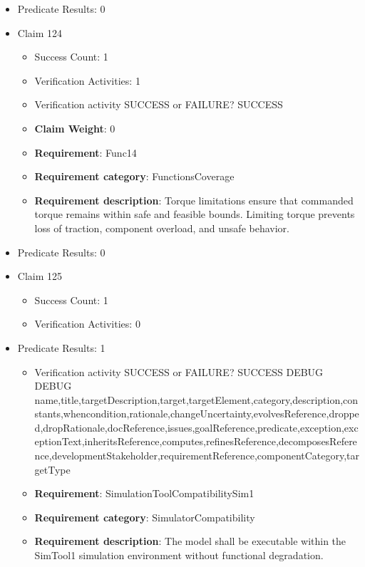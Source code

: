 \documentclass{article}
\begin{document}
\begin{itemize}
\begin{itemize}
				\end{itemize}
				
									    
				\item Predicate Results: 0

  				  \item Claim 124
				\begin{itemize}
			    	\item Success Count: 1 
			    	\item Verification Activities: 1
					\item Verification activity SUCCESS or FAILURE? SUCCESS
					\item \textbf{Claim Weight}: 0
						\item \textbf{Requirement}: Func14 
						\item \textbf{Requirement category}: FunctionsCoverage 
						\item \textbf{Requirement description}: Torque limitations ensure that commanded torque remains within safe and feasible bounds. Limiting torque prevents loss of traction, component overload, and unsafe behavior.
					
				\end{itemize}
				
									    
				\item Predicate Results: 0

  				  \item Claim 125
				\begin{itemize}
			    	\item Success Count: 1 
			    	\item Verification Activities: 0
				\end{itemize}
				
									    
				\item Predicate Results: 1
					\begin{itemize}				
					\item Verification activity SUCCESS or FAILURE? SUCCESS
					DEBUG DEBUG name,title,targetDescription,target,targetElement,category,description,constants,whencondition,rationale,changeUncertainty,evolvesReference,dropped,dropRationale,docReference,issues,goalReference,predicate,exception,exceptionText,inheritsReference,computes,refinesReference,decomposesReference,developmentStakeholder,requirementReference,componentCategory,targetType
					\item \textbf{Requirement}: SimulationToolCompatibilitySim1 
					\item \textbf{Requirement category}: SimulatorCompatibility
					\item \textbf{Requirement description}: The model shall be executable within the SimTool1 simulation environment without functional degradation.
					\end{itemize}


\end{itemize}
\end{document}
